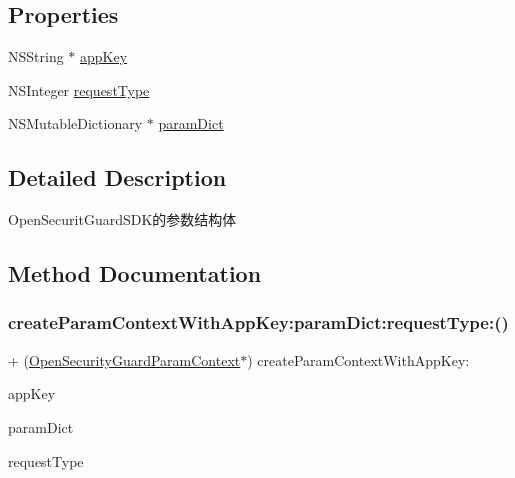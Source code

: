 \subsection*{Properties}
\begin{DoxyCompactItemize}
\item 
N\+S\+String $\ast$ \mbox{\hyperlink{interface_open_security_guard_param_context_a8d76e9dd1c654d4f8bd20b62cb5f078e}{app\+Key}}
\item 
N\+S\+Integer \mbox{\hyperlink{interface_open_security_guard_param_context_a7d6edca9cf8d72f6d92bae20b6fafba7}{request\+Type}}
\item 
N\+S\+Mutable\+Dictionary $\ast$ \mbox{\hyperlink{interface_open_security_guard_param_context_a78d326f3a4c2e822decd50d429a1c2f4}{param\+Dict}}
\end{DoxyCompactItemize}


\subsection{Detailed Description}
Open\+Securit\+Guard\+S\+D\+K的参数结构体 

\subsection{Method Documentation}
\mbox{\label{interface_open_security_guard_param_context_ada3860c989e82a3a6dd9ad72296f3a61}} 
\subsubsection{\texorpdfstring{create\+Param\+Context\+With\+App\+Key\+:param\+Dict\+:request\+Type\+:()}{createParamContextWithAppKey:paramDict:requestType:()}}
{\footnotesize\ttfamily + (\mbox{\hyperlink{interface_open_security_guard_param_context}{Open\+Security\+Guard\+Param\+Context}}$\ast$) create\+Param\+Context\+With\+App\+Key\+: \begin{DoxyParamCaption}\item[{(N\+S\+String $\ast$)}]{app\+Key }\item[{paramDict:(N\+S\+Dictionary $\ast$)}]{param\+Dict }\item[{requestType:(N\+S\+Integer)}]{request\+Type }\end{DoxyParamCaption}}

